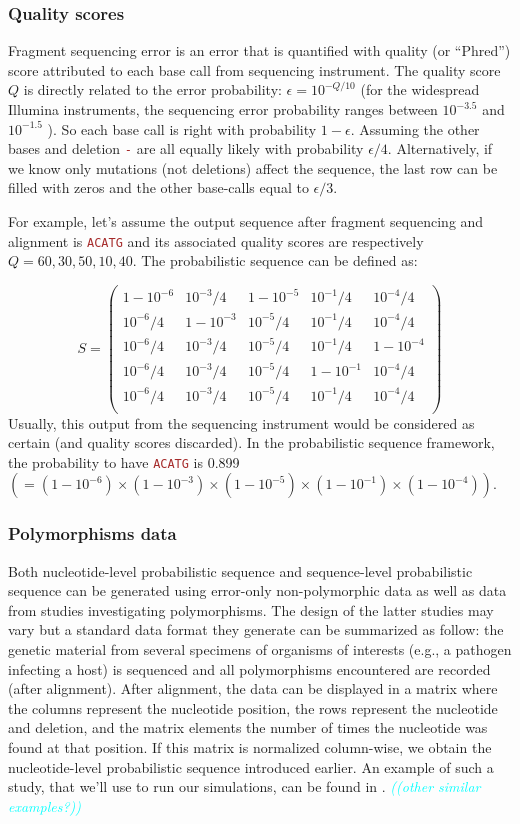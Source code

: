 \documentclass[10pt]{article}
\newcommand{\comment}[1]{\textsl{\textcolor{cyan}{((#1))}}}
\newcommand{\sq}[1]{\texttt{\textcolor{brown}{#1}}}
\newcommand{\nlps}{nucleotide-level probabilistic sequence\xspace}
\newcommand{\slps}{sequence-level probabilistic sequence\xspace}
\begin{document}
\subsubsection{Quality scores}
Fragment sequencing error is an error that is quantified with quality (or ``Phred'') score attributed to each base call from sequencing instrument. 
The quality score $Q$ is directly related to the error probability: $\epsilon = 10^{-Q/10}$ \cite{xxx} (for the widespread Illumina instruments, the sequencing error probability ranges between $10^{-3.5}$ and  $10^{-1.5}$ \cite{xxx}).  
So each base call is right with probability $1-\epsilon$. Assuming the other bases and deletion \sq{-} are all equally likely with probability $\epsilon/4$. Alternatively, if we know only mutations (not deletions) affect the sequence, the last row can be filled with zeros and the other base-calls equal to $\epsilon/3$.

For example, let's assume the output sequence after fragment sequencing and alignment is \sq{ACATG} and its associated quality scores are respectively $Q=60,30,50,10,40$. The probabilistic sequence can be defined as:

$$
S = 
\begin{pmatrix}
1-10^{-6} & 10^{-3}/4  & 1-10^{-5} & 10^{-1}/4 & 10^{-4}/4  \\
10^{-6}/4 & 1-10^{-3}  & 10^{-5}/4 & 10^{-1}/4 & 10^{-4}/4  \\
10^{-6}/4 & 10^{-3}/4  & 10^{-5}/4 & 10^{-1}/4 & 1-10^{-4} \\
10^{-6}/4 & 10^{-3}/4  & 10^{-5}/4 & 1-10^{-1} & 10^{-4}/4\\
10^{-6}/4 & 10^{-3}/4  & 10^{-5}/4 & 10^{-1}/4 & 10^{-4}/4 \\
\end{pmatrix}
$$
Usually, this output from the sequencing instrument would be considered as certain (and quality scores discarded). In the probabilistic sequence framework, the probability to have \sq{ACATG} is 0.899 ${\displaystyle(=(1-10^{-6})\times (1-10^{-3})\times (1-10^{-5})\times (1-10^{-1})\times (1-10^{-4}))}$.

\subsubsection{Polymorphisms data}
Both \nlps and \slps can be generated using error-only non-polymorphic data as well as data from studies investigating polymorphisms.
The design of the latter studies may vary but a standard data format they generate can be summarized as follow: the genetic material from several specimens of organisms of interests (e.g., a pathogen infecting a host) is sequenced and all polymorphisms encountered are recorded (after alignment). 
After alignment, the data can be displayed in a matrix where the columns represent the nucleotide position, the rows represent the nucleotide and deletion, and the matrix elements the number of times the nucleotide was found at that position.
If this matrix is normalized column-wise, we obtain the \nlps introduced earlier. 
An example of such a study, that we'll use to run our simulations, can be found in \cite{Zanini:2015}. \comment{other similar examples?}
\end{document}
